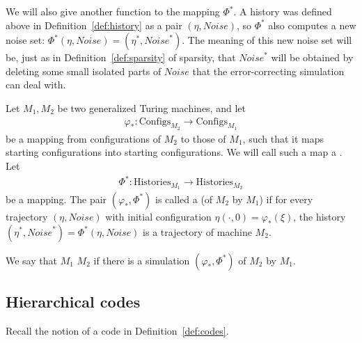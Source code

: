 \documentclass[12pt]{memoir}
\newcommand{\Configs}{\mathrm{Configs}}
\newcommand{\Noise}{\mathit{Noise}}
\newcommand{\Histories}{\mathrm{Histories}}
\begin{document}
We will also give another function to the mapping \( \Phi^{*} \).
A history was defined above in Definition~\ref{def:history} 
as a pair \( (\eta,\Noise) \),
so \( \Phi^{*} \) also computes a new noise set:
\( \Phi^{*}(\eta,\Noise)=(\eta^{*},\Noise^{*}) \).
The meaning of this new noise set will be, just as in Definition~\ref{def:sparsity} of sparsity,
that 
\( \Noise^{*} \) will be obtained by deleting some small isolated parts of \( \Noise \) that the 
error-correcting simulation can deal with.

\begin{definition}[Simulation] \label{def:simulation-central}
Let \( M_{1},M_{2} \) be two generalized Turing machines, and let
\begin{align*}
    \varphi_{*}:\Configs_{M_{2}} \to \Configs_{M_{1}}
\end{align*}
be a mapping from configurations of \( M_{2} \)
to those of \( M_{1} \), such that it maps
starting configurations into starting configurations.
We will call such a map a .
Let
\begin{align*}
   \Phi^{*}:\Histories_{M_{1}} \to \Histories_{M_{2}}
\end{align*}
be a mapping.
The pair \( (\varphi_{*}, \Phi^{*})  \)
is called a  (of \(  M_{2}  \) by \(  M_{1}  \)) if for every
trajectory \(  (\eta, \Noise)  \) with initial
configuration \(  \eta(\cdot,0)=\varphi_{*}(\xi)  \),
the history \(  (\eta^{*},\Noise^{*})=\Phi^{*}(\eta,\Noise)  \) is
a trajectory of machine \(  M_{2}  \).

We say that \( M_{1} \)  \( M_{2} \) if there is a simulation
\( (\varphi_{*},\Phi^{*}) \) of \( M_{2} \) by \( M_{1} \).
\end{definition}

\subsection{Hierarchical codes}\label{sec:hier-codes}

Recall the notion of a code in Definition~\ref{def:codes}.
\end{document}
